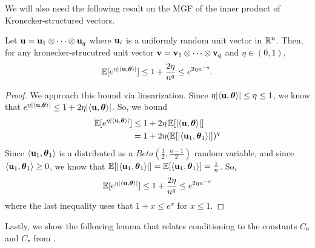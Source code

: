 We will also need the following result on the MGF of the inner product of Kronecker-structured vectors.

\begin{lemma}
\label{lem:kron-unit-vec-mgf}
Let \(\boldsymbol{\mathrm{u}} = \boldsymbol{\mathrm{u}}_1 \otimes \cdots \otimes \boldsymbol{\mathrm{u}}_q\) where \(\boldsymbol{\mathrm{u}}_i\) is a uniformly random unit vector in \({\mathbb R}^n\).
Then, for any kronecker-strucutred unit vector \(\boldsymbol{\mathrm{v}} = \boldsymbol{\mathrm{v}}_1 \otimes \cdots \otimes \boldsymbol{\mathrm{v}}_q\) and \(\eta \in (0,1)\),
\[
	\operatorname*{\mathbb{E}}[e^{\eta|\langle\boldsymbol{\mathrm{u}},\boldsymbol{\theta}\rangle|}]
    \leq 1 + \frac{2\eta}{n^q}
    \leq e^{2\eta n^{-q}}.
\]
\end{lemma}
\begin{proof}
We approach this bound via linearization.
Since \(\eta|\langle\boldsymbol{\mathrm{u}},\boldsymbol{\theta}\rangle| \leq \eta \leq 1\), we know that \(e^{\eta|\langle\boldsymbol{\mathrm{u}},\boldsymbol{\theta}\rangle|} \leq 1+2\eta|\langle\boldsymbol{\mathrm{u}},\boldsymbol{\theta}\rangle|\).
So, we bound
\begin{align*}
    \operatorname*{\mathbb{E}}[e^{\eta|\langle\boldsymbol{\mathrm{u}},\boldsymbol{\theta}\rangle|}]
    &\leq 1+2\eta \operatorname*{\mathbb{E}}[|\langle\boldsymbol{\mathrm{u}},\boldsymbol{\theta}\rangle|] \\
    &= 1+2\eta (\operatorname*{\mathbb{E}}[|\langle\boldsymbol{\mathrm{u}}_1,\boldsymbol{\theta}_1\rangle|])^q
\end{align*}
Since \(\langle\boldsymbol{\mathrm{u}}_1,\boldsymbol{\theta}_1\rangle\) is a distributed as a \(Beta(\frac12,\frac{n-1}{2})\) random variable, and since \(\langle\boldsymbol{\mathrm{u}}_1,\boldsymbol{\theta}_1\rangle \geq 0\), we know that \(\operatorname*{\mathbb{E}}[|\langle\boldsymbol{\mathrm{u}}_1,\boldsymbol{\theta}_1\rangle|] = \operatorname*{\mathbb{E}}[\langle\boldsymbol{\mathrm{u}}_1,\boldsymbol{\theta}_1\rangle] = \frac1n\).
So,
\[
    \operatorname*{\mathbb{E}}[e^{\eta|\langle\boldsymbol{\mathrm{u}},\boldsymbol{\theta}\rangle|}] \leq 1 + \frac{2\eta}{n^q}
    \leq e^{2\eta n^{-q}}
\]
where the last inequality uses that \(1+x \leq e^{x}\) for \(x \leq 1\).
\end{proof}

Lastly, we show the following lemma that relates conditioning to the constants \(C_0\) and \(C_\tau\) from .

